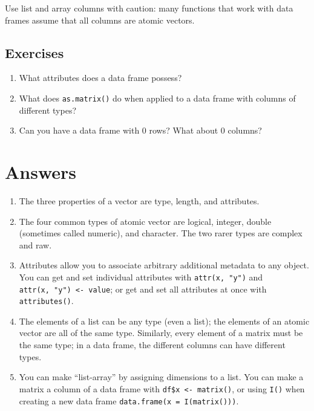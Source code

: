 Use list and array columns with caution: many functions that work with
data frames assume that all columns are atomic vectors.

\hypertarget{exercises-3}{%
\subsection{Exercises}\label{exercises-3}}

\begin{enumerate}
\def\labelenumi{\arabic{enumi}.}
\item
  What attributes does a data frame possess?
\item
  What does \texttt{as.matrix()} do when applied to a data frame with
  columns of different types?
\item
  Can you have a data frame with 0 rows? What about 0 columns?
\end{enumerate}

\hypertarget{data-structure-answers}{%
\section{Answers}\label{data-structure-answers}}

\begin{enumerate}
\def\labelenumi{\arabic{enumi}.}
\item
  The three properties of a vector are type, length, and attributes.
\item
  The four common types of atomic vector are logical, integer, double
  (sometimes called numeric), and character. The two rarer types are
  complex and raw.
\item
  Attributes allow you to associate arbitrary additional metadata to any
  object. You can get and set individual attributes with
  \texttt{attr(x,\ "y")} and
  \texttt{attr(x,\ "y")\ \textless{}-\ value}; or get and set all
  attributes at once with \texttt{attributes()}.
\item
  The elements of a list can be any type (even a list); the elements of
  an atomic vector are all of the same type. Similarly, every element of
  a matrix must be the same type; in a data frame, the different columns
  can have different types.
\item
  You can make ``list-array'' by assigning dimensions to a list. You can
  make a matrix a column of a data frame with
  \texttt{df\$x\ \textless{}-\ matrix()}, or using \texttt{I()} when
  creating a new data frame \texttt{data.frame(x\ =\ I(matrix()))}.
\end{enumerate}
